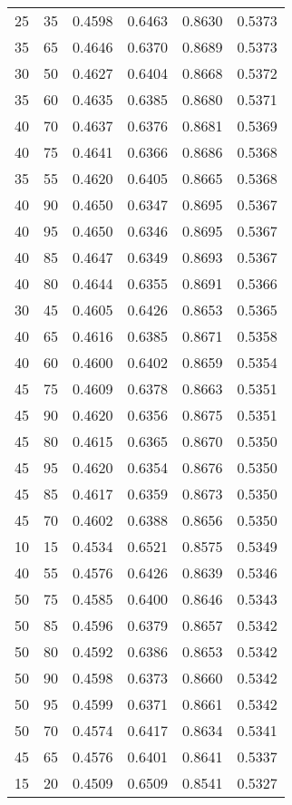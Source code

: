 \begin{center}
\begin{longtable}{|l|l|l|l|l|l|}
25 & 35 & 0.4598 & 0.6463 & 0.8630 & 0.5373 \\
35 & 65 & 0.4646 & 0.6370 & 0.8689 & 0.5373 \\
30 & 50 & 0.4627 & 0.6404 & 0.8668 & 0.5372 \\
35 & 60 & 0.4635 & 0.6385 & 0.8680 & 0.5371 \\
40 & 70 & 0.4637 & 0.6376 & 0.8681 & 0.5369 \\
40 & 75 & 0.4641 & 0.6366 & 0.8686 & 0.5368 \\
35 & 55 & 0.4620 & 0.6405 & 0.8665 & 0.5368 \\
40 & 90 & 0.4650 & 0.6347 & 0.8695 & 0.5367 \\
40 & 95 & 0.4650 & 0.6346 & 0.8695 & 0.5367 \\
40 & 85 & 0.4647 & 0.6349 & 0.8693 & 0.5367 \\
40 & 80 & 0.4644 & 0.6355 & 0.8691 & 0.5366 \\
30 & 45 & 0.4605 & 0.6426 & 0.8653 & 0.5365 \\
40 & 65 & 0.4616 & 0.6385 & 0.8671 & 0.5358 \\
40 & 60 & 0.4600 & 0.6402 & 0.8659 & 0.5354 \\
45 & 75 & 0.4609 & 0.6378 & 0.8663 & 0.5351 \\
45 & 90 & 0.4620 & 0.6356 & 0.8675 & 0.5351 \\
45 & 80 & 0.4615 & 0.6365 & 0.8670 & 0.5350 \\
45 & 95 & 0.4620 & 0.6354 & 0.8676 & 0.5350 \\
45 & 85 & 0.4617 & 0.6359 & 0.8673 & 0.5350 \\
45 & 70 & 0.4602 & 0.6388 & 0.8656 & 0.5350 \\
10 & 15 & 0.4534 & 0.6521 & 0.8575 & 0.5349 \\
40 & 55 & 0.4576 & 0.6426 & 0.8639 & 0.5346 \\
50 & 75 & 0.4585 & 0.6400 & 0.8646 & 0.5343 \\
50 & 85 & 0.4596 & 0.6379 & 0.8657 & 0.5342 \\
50 & 80 & 0.4592 & 0.6386 & 0.8653 & 0.5342 \\
50 & 90 & 0.4598 & 0.6373 & 0.8660 & 0.5342 \\
50 & 95 & 0.4599 & 0.6371 & 0.8661 & 0.5342 \\
50 & 70 & 0.4574 & 0.6417 & 0.8634 & 0.5341 \\
45 & 65 & 0.4576 & 0.6401 & 0.8641 & 0.5337 \\
15 & 20 & 0.4509 & 0.6509 & 0.8541 & 0.5327 \\

\end{longtable}
\end{center}
